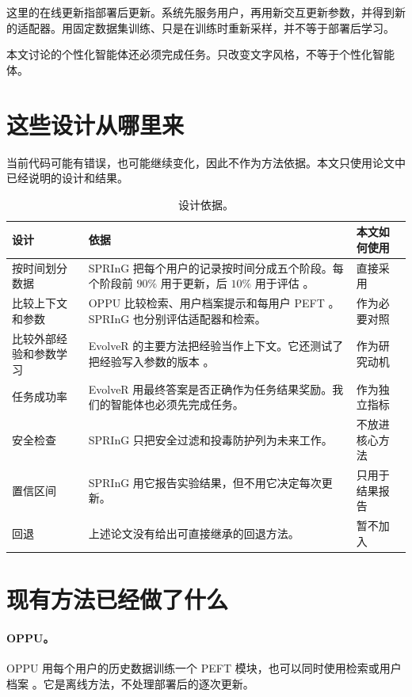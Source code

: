 \documentclass[11pt,UTF8,fontset=fandol]{ctexart}
\begin{document}
这里的在线更新指部署后更新。系统先服务用户，再用新交互更新参数，并得到新的适配器。用固定数据集训练、只是在训练时重新采样，并不等于部署后学习。

本文讨论的个性化智能体还必须完成任务。只改变文字风格，不等于个性化智能体。

\section{这些设计从哪里来}

当前代码可能有错误，也可能继续变化，因此不作为方法依据。本文只使用论文中已经说明的设计和结果。

\begin{table}[ht]
  \centering
  \caption{设计依据。}
  \begin{tabularx}{\textwidth}{@{}L{0.20\textwidth}L{0.52\textwidth}Y@{}}
    \toprule
    设计 & 依据 & 本文如何使用 \\
    \midrule
    按时间划分数据 &
    SPRInG 把每个用户的记录按时间分成五个阶段。每个阶段前 \(90\%\) 用于更新，后 \(10\%\) 用于评估 \cite{kim2026spring}。 &
    直接采用 \\
    比较上下文和参数 &
    OPPU 比较检索、用户档案提示和每用户 PEFT
    \cite{tan2024oppu}。SPRInG 也分别评估适配器和检索。 &
    作为必要对照 \\
    比较外部经验和参数学习 &
    EvolveR 的主要方法把经验当作上下文。它还测试了把经验写入参数的版本
    \cite{wu2025evolver}。 &
    作为研究动机 \\
    任务成功率 &
    EvolveR 用最终答案是否正确作为任务结果奖励。我们的智能体也必须先完成任务。 &
    作为独立指标 \\
    安全检查 &
    SPRInG 只把安全过滤和投毒防护列为未来工作。 &
    不放进核心方法 \\
    置信区间 &
    SPRInG 用它报告实验结果，但不用它决定每次更新。 &
    只用于结果报告 \\
    回退 &
    上述论文没有给出可直接继承的回退方法。 &
    暂不加入 \\
    \bottomrule
  \end{tabularx}
\end{table}

\section{现有方法已经做了什么}

\paragraph{OPPU。}
OPPU 用每个用户的历史数据训练一个 PEFT 模块，也可以同时使用检索或用户档案
\cite{tan2024oppu}。它是离线方法，不处理部署后的逐次更新。
\end{document}

